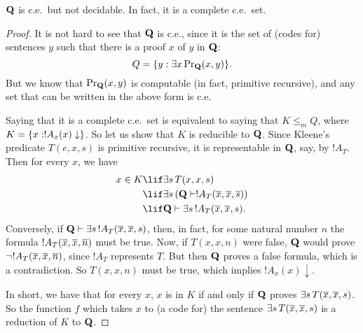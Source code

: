 \documentclass[../../../include/open-logic-section]{subfiles}
\begin{document}



\begin{thm}
  $\mathbf{Q}$ is c.e.\ but not decidable. In fact, it is a complete c.e.\ set.
\end{thm}

\begin{proof}
It is not hard to see that $\mathbf{Q}$ is c.e., since it is the set of
(codes for) sentences $y$ such that there is a proof $x$ of $y$ in
$\mathbf{Q}$:
\[
Q = \Setabs{y}{\lexists[x][\fn{Pr}_\Th{Q}(x,y)]}.
\]
But we know that $\mathrm{Pr}_{\mathbf{Q}}(x,y)$ is computable (in fact, primitive
recursive), and any set that can be written in the above form is c.e.

Saying that it is a complete c.e.\ set is equivalent to saying that $K
\leq_m Q$, where $K = \{ x : !A_x(x) \downarrow \}$. So let us show
that $K$ is reducible to $\mathbf{Q}$. Since Kleene's predicate $T(e,x,s)$ is
primitive recursive, it is representable in $\mathbf{Q}$, say, by $!A_T$. Then
for every $x$, we have
\begin{align*}
x \in K & \lif \lexists[s][T(x,x,s)] \\
& \lif \lexists[s][(\Th{Q} \Proves !A_T(\num x,\num x, \num s))]
  \\
& \lif \Th{Q} \Proves \lexists[s][!A_T(\num x, \num x, s)].
\end{align*}
Conversely, if $\Th{Q} \Proves \lexists[s][!A_T(\num x, \num x, s)]$,
then, in fact, for some natural number $n$ the formula $!A_T(\overline{x},
\overline{x}, \overline{n})$ must be true.  Now, if $T(x,x,n)$ were false,
$\mathbf{Q}$ would prove $\lnot !A_T(\overline{x}, \overline{x}, \overline{n})$, since
$!A_T$ represents $T$.  But then $\mathbf{Q}$ proves a false formula,
which is a contradiction. So $T(x,x,n)$ must be true, which implies
$!A_x(x) \downarrow$.

In short, we have that for every $x$, $x$ is in $K$ if and only if
$\mathbf{Q}$ proves $\lexists[s][T(\num x,\num x,s)]$. So the function $f$
which takes $x$ to (a code for) the sentence $\lexists[s][T(\num x,
  \num x, s)]$ is a reduction of $K$ to $\mathbf{Q}$.
\end{proof}
\end{document}
